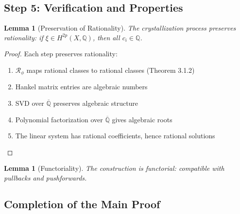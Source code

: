 \documentclass[11pt,a4paper]{article}
\theoremstyle{plain}
\newtheorem{lemma}[theorem]{Lemma}
\theoremstyle{definition}
\theoremstyle{remark}
\newcommand{\fracres}{\mathcal{R}}
\newcommand{\Q}{\mathbb{Q}}
\newcommand{\goldenratio}{\phi}
\begin{document}
\subsection{Step 5: Verification and Properties}

\begin{lemma}[Preservation of Rationality]
The crystallization process preserves rationality: if $\xi \in H^{2p}(X,\Q)$, then all $c_i \in \Q$.
\end{lemma}

\begin{proof}
Each step preserves rationality:
\begin{enumerate}
\item $\fracres_{\goldenratio}$ maps rational classes to rational classes (Theorem 3.1.2)
\item Hankel matrix entries are algebraic numbers
\item SVD over $\overline{\Q}$ preserves algebraic structure
\item Polynomial factorization over $\overline{\Q}$ gives algebraic roots
\item The linear system has rational coefficients, hence rational solutions
\end{enumerate}
\end{proof}

\begin{lemma}[Functoriality]
The construction is functorial: compatible with pullbacks and pushforwards.
\end{lemma}

\subsection{Completion of the Main Proof}
\end{document}
